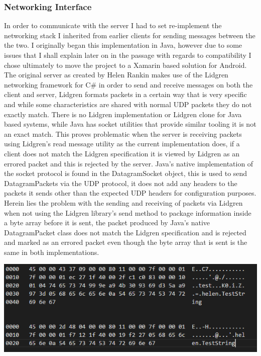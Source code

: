 \documentclass{article}
\begin{document}
\subsubsection{Networking Interface}
In order to communicate with the server I had to set re-implement the networking stack I inherited from earlier clients for sending messages between the the two. I originally began this implementation in Java, however due to some issues that I shall explain later on in the passage with regards to compatibility I chose ultimately to move the project to a Xamarin based solution for Android. The original server as created by Helen Rankin makes use of the Lidgren networking framework for C\# in order to send and receive messages on both the client and server, Lidgren formats packets in a certain way that is very specific and while some characteristics are shared with normal UDP packets they do not exactly match. There is no Lidgren implementation or Lidgren clone for Java based systems, while Java has socket utilities that provide similar tooling it is not an exact match. This proves problematic when the server is receiving packets using Lidgren’s read message utility as the current implementation does, if a client does not match the Lidgren specification it is viewed by Lidgren as an errored packet and this is rejected by the server. Java’s native implementation of the socket protocol is found in the DatagramSocket object, this is used to send DatagramPackets via the UDP protocol, it does not add any headers to the packets it sends other than the expected UDP headers for configuration purposes. Herein lies the problem with the sending and receiving of packets via Lidgren when not using the Lidgren library’s send method to package information inside a byte array before it is sent, the packet produced by Java’s native DatagramPacket class does not match the Lidgren specification and is rejected and marked as an errored packet even though the byte array that is sent is the same in both implementations. \\
\begin{center}
\includegraphics{packetdiff.png}
\end{center}
\end{document}
